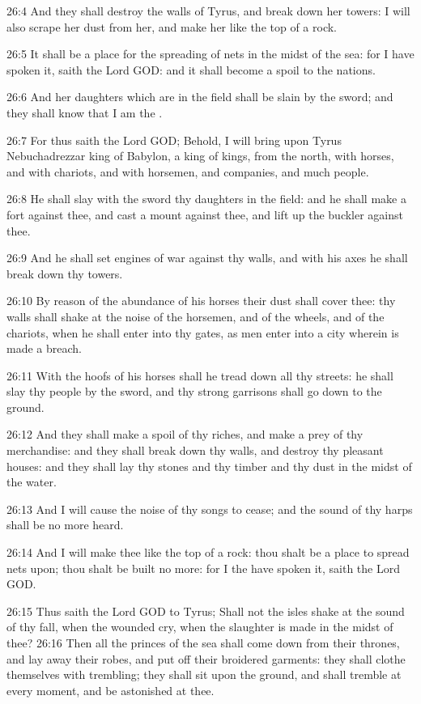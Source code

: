 26:4 And they shall destroy the walls of Tyrus, and break down her
towers: I will also scrape her dust from her, and make her like the
top of a rock.

26:5 It shall be a place for the spreading of nets in the midst of the
sea: for I have spoken it, saith the Lord GOD: and it shall become a
spoil to the nations.

26:6 And her daughters which are in the field shall be slain by the
sword; and they shall know that I am the \LORD.

26:7 For thus saith the Lord GOD; Behold, I will bring upon Tyrus
Nebuchadrezzar king of Babylon, a king of kings, from the north, with
horses, and with chariots, and with horsemen, and companies, and much
people.

26:8 He shall slay with the sword thy daughters in the field: and he
shall make a fort against thee, and cast a mount against thee, and
lift up the buckler against thee.

26:9 And he shall set engines of war against thy walls, and with his
axes he shall break down thy towers.

26:10 By reason of the abundance of his horses their dust shall cover
thee: thy walls shall shake at the noise of the horsemen, and of the
wheels, and of the chariots, when he shall enter into thy gates, as
men enter into a city wherein is made a breach.

26:11 With the hoofs of his horses shall he tread down all thy
streets: he shall slay thy people by the sword, and thy strong
garrisons shall go down to the ground.

26:12 And they shall make a spoil of thy riches, and make a prey of
thy merchandise: and they shall break down thy walls, and destroy thy
pleasant houses: and they shall lay thy stones and thy timber and thy
dust in the midst of the water.

26:13 And I will cause the noise of thy songs to cease; and the sound
of thy harps shall be no more heard.

26:14 And I will make thee like the top of a rock: thou shalt be a
place to spread nets upon; thou shalt be built no more: for I the \LORD
have spoken it, saith the Lord GOD.

26:15 Thus saith the Lord GOD to Tyrus; Shall not the isles shake at
the sound of thy fall, when the wounded cry, when the slaughter is
made in the midst of thee?  26:16 Then all the princes of the sea
shall come down from their thrones, and lay away their robes, and put
off their broidered garments: they shall clothe themselves with
trembling; they shall sit upon the ground, and shall tremble at every
moment, and be astonished at thee.

